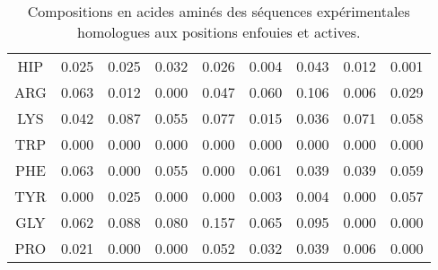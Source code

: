 \begin{table}[!htbp]
\begin{tabular}{ccccccccc}
     HIP  & 0.025  &     0.025   &    0.032   &    0.026   &    0.004   &    0.043   &    0.012  &     0.001  \\
        \cmidrule{1-9}
     ARG  & 0.063  &     0.012   &    0.000   &    0.047   &    0.060   &    0.106   &    0.006  &     0.029  \\
        \cmidrule{1-9}
     LYS  & 0.042  &     0.087   &    0.055   &    0.077   &    0.015   &    0.036   &    0.071  &     0.058  \\
     TRP  & 0.000  &     0.000   &    0.000   &    0.000   &    0.000   &    0.000   &    0.000  &     0.000  \\
     PHE  & 0.063  &     0.000   &    0.055   &    0.000   &    0.061   &    0.039   &    0.039  &     0.059  \\
        \cmidrule{1-9}
     TYR  & 0.000  &     0.025   &    0.000   &    0.000   &    0.003   &    0.004   &    0.000  &     0.057  \\
     GLY  & 0.062  &     0.088   &    0.080   &    0.157   &    0.065   &    0.095   &    0.000  &     0.000  \\
     PRO  & 0.021  &     0.000   &    0.000   &    0.052   &    0.032   &    0.039   &    0.006  &     0.000  \\


        \bottomrule


      \end{tabular}      
      \caption{Compositions en acides aminés des séquences expérimentales homologues aux positions enfouies et actives.}
\label{tab:freq_AA_ALL}      
    \end{table}

